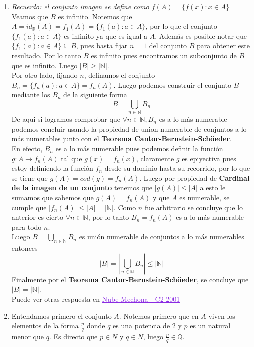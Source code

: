 \documentclass[letterpaper,12pt]{article}
\newcommand{\Q}{\mathbb Q}
\newcommand{\R}{\mathbb R}
\newcommand{\N}{\mathbb N}
\theoremstyle{plain}
\begin{document}
\begin{enumerate}[a)]
\begin{enumerate}[\bf P1.]
        \item \textit{Recuerdo: el conjunto imagen se define como $f(A)=\{f(x) : x\in A \}$}\\
        Veamos que $B$ es infinito. Notemos que $A=id_{\R}(A)=f_{1}(A)=\{f_{1}(a): a\in A \}$, por lo que el conjunto $\{f_{1}(a): a\in A \}$ es infinito ya que es igual a $A$. Además es posible notar que $\{f_{1}(a): a\in A \} \subseteq B$, pues basta fijar $n=1$ del conjunto $B$ para obtener este resultado. Por lo tanto $B$ es infinito pues encontramos un subconjunto de $B$ que es infinito. Luego $|B|\geq|\N|$.\\
        Por otro lado, fijando $n$, definamos el conjunto $B_n=\{f_n(a) : a\in A\}=f_n(A)$. Luego podemos construir el conjunto $B$ mediante los $B_n$ de la siguiente forma
        $$\displaystyle B=\bigcup_{n\in \N}B_n $$
        De aqui si logramos comprobar que $\forall n \in \N, B_n$ es a lo más numerable podemos concluir usando la propiedad de union numerable de conjuntos a lo más numerables junto con el \textbf{Teorema Cantor-Bernstein-Schöeder}.\\
        En efecto, $B_n$ es a lo más numerable pues podemos definir la función $g:A \to f_n(A)$ tal que $g(x)=f_n(x)$, claramente $g$ es epiyectiva pues estoy definiendo la función $f_n$ desde su dominio hasta su recorrido, por lo que se tiene que $g(A)=cod(g)=f_n(A)$. Luego por propiedad de \textbf{Cardinal de la imagen de un conjunto} tenemos que $|g(A)|\leq|A|$ a esto le sumamos que sabemos que $g(A)=f_n(A)$ y que $A$ es numerable, se cumple que $|f_n(A)|\leq|A|=|\N|$. Como $n$ fue arbitrario se concluye que lo anterior es cierto $\forall n \in \N$, por lo tanto $B_n=f_n(A)$ es a lo más numerable para todo $n$.\\
        Luego $\displaystyle B=\bigcup_{n\in \N}B_n $ es unión numerable de conjuntos a lo más numerables entonces $$\displaystyle |B|=|\bigcup_{n\in \N}B_n |\leq |\N|$$
        Finalmente por el \textbf{Teorema Cantor-Bernstein-Schöeder}, se concluye que $|B|=|\N|$.
        \\
        
        Puede ver otras respuesta en \href{https://drive.google.com/drive/folders/0B2BWTqIXpSJsakxLVUNxejQyc1U}{\textcolor{BlueViolet}{\underline{Nube Mechona - C2 2001}}}\\
        \newpage 
        \item Entendamos primero el conjunto $A$. Notemos primero que en $A$ viven los elementos de la forma $\frac{p}{q}$ donde $q$ es una potencia de $2$ y $p$ es un natural menor que $q$. Es directo que $p\in N$ y $q\in N$, luego $\frac{p}{q} \in \Q$.\\
        

\end{enumerate}
\end{enumerate}
\end{document}
